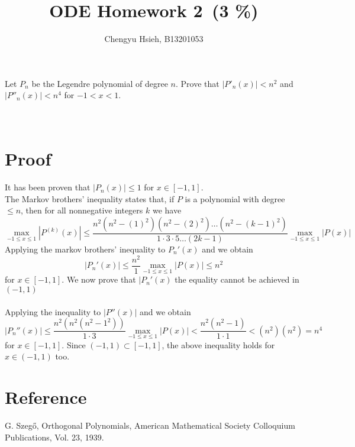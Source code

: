 \documentclass[A4paper,12pt]{article}
\title{ODE Homework 2\, (3 \%)}
\author{Chengyu Hsieh, B13201053}
\date{}
\theoremstyle{definition}
\numberwithin{equation}{section}
\begin{document}
\maketitle
Let \(P_n\) be the Legendre polynomial of degree \(n\). Prove that \(|
P'_n(x)|<n^2\) and \(|P''_n(x)|<n^4\) for \(-1<x<1\).\\
\\\\
\section*{Proof}
It has been proven that $|P_{n}(x)| \leq 1$ for $x \in [-1, 1]$. \\
The Markov brothers' inequality states that, if $P$ is a polynomial with degree $\leq n$, then for all nonnegative integers $k$ we have $$\max_{-1\leq x \leq 1} |P^{(k)}(x)| \leq \frac{n^{2}(n^{2}-(1)^{2})(n^{2}-(2)^{2})\dots (n^{2}-(k-1)^{2})}{1 \cdot 3 \cdot 5 \dots (2k-1)} \max_{-1 \leq x \leq 1} |P(x)|$$
Applying the markov brothers' inequality to $P_{n}'(x)$ and we obtain
$$
|P_{n}'(x)| \leq \frac{n^{2}}{1} \max_{-1 \leq x \leq 1} |P(x)| \leq n^{2}
$$
for $x \in [-1, 1]$. We now prove that $|P_{n}'(x)$ the equality cannot be achieved in $(-1,1)$
\\\\
Applying the inequality to $|P''(x)|$ and we obtain
$$
|P_{n}''(x)| \leq \frac{n^{2}(n^{2}(n^{2}-1^{2}))}{1 \cdot 3}\max_{-1 \leq x \leq 1} |P(x)| < \frac{n^{2}(n^{2}-1)}{1 \cdot 1} < (n^{2})(n^{2}) = n^{4}
$$
for $x \in [-1, 1]$. Since $(-1, 1) \subset [-1,1]$, the above inequality holds for $x\in (-1, 1)$ too.
\section*{Reference}
G. Szegő, Orthogonal Polynomials, American Mathematical Society Colloquium Publications, Vol. 23, 1939.\\
\end{document}

